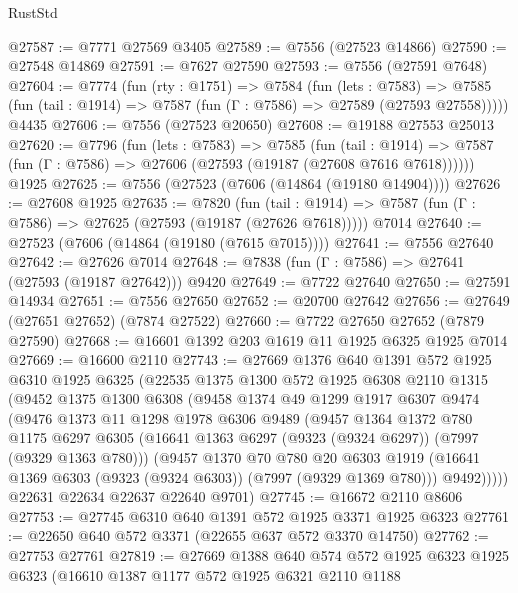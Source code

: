 \begin{lexlean}{RustStd}
\begin{coremodule}
@27587 := @7771 @27569 @3405
@27589 := @7556 (@27523 @14866)
@27590 := @27548 @14869
@27591 := @7627 @27590
@27593 := @7556 (@27591 @7648)
@27604 := @7774
    (fun (rty : @1751) =>
    @7584
      (fun (lets : @7583) =>
      @7585 (fun (tail : @1914) => @7587 (fun (Γ : @7586) => @27589 (@27593 @27558)))))
    @4435
@27606 := @7556 (@27523 @20650)
@27608 := @19188 @27553 @25013
@27620 := @7796
    (fun (lets : @7583) =>
    @7585
      (fun (tail : @1914) =>
      @7587 (fun (Γ : @7586) => @27606 (@27593 (@19187 (@27608 @7616 @7618))))))
    @1925
@27625 := @7556 (@27523 (@7606 (@14864 (@19180 @14904))))
@27626 := @27608 @1925
@27635 := @7820
    (fun (tail : @1914) => @7587 (fun (Γ : @7586) => @27625 (@27593 (@19187 (@27626 @7618)))))
    @7014
@27640 := @27523 (@7606 (@14864 (@19180 (@7615 @7015))))
@27641 := @7556 @27640
@27642 := @27626 @7014
@27648 := @7838 (fun (Γ : @7586) => @27641 (@27593 (@19187 @27642))) @9420
@27649 := @7722 @27640
@27650 := @27591 @14934
@27651 := @7556 @27650
@27652 := @20700 @27642
@27656 := @27649 (@27651 @27652) (@7874 @27522)
@27660 := @7722 @27650 @27652 (@7879 @27590)
@27668 := @16601 @1392 @203 @1619 @11 @1925 @6325 @1925 @7014
@27669 := @16600 @2110
@27743 := @27669
    @1376
    @640
    @1391
    @572
    @1925
    @6310
    @1925
    @6325
    (@22535
      @1375
      @1300
      @572
      @1925
      @6308
      @2110
      @1315
      (@9452
        @1375
        @1300
        @6308
        (@9458
          @1374
          @49
          @1299
          @1917
          @6307
          @9474
          (@9476
            @1373
            @11
            @1298
            @1978
            @6306
            @9489
            (@9457
              @1364
              @1372
              @780
              @1175
              @6297
              @6305
              (@16641 @1363 @6297 (@9323 (@9324 @6297)) (@7997 (@9329 @1363 @780)))
              (@9457
                @1370
                @70
                @780
                @20
                @6303
                @1919
                (@16641 @1369 @6303 (@9323 (@9324 @6303)) (@7997 (@9329 @1369 @780)))
                @9492)))))
      @22631
      @22634
      @22637
      @22640
      @9701)
@27745 := @16672 @2110 @8606
@27753 := @27745 @6310 @640 @1391 @572 @1925 @3371 @1925 @6323
@27761 := @22650 @640 @572 @3371 (@22655 @637 @572 @3370 @14750)
@27762 := @27753 @27761
@27819 := @27669
    @1388
    @640
    @574
    @572
    @1925
    @6323
    @1925
    @6323
    (@16610
      @1387
      @1177
      @572
      @1925
      @6321
      @2110
      @1188

\end{coremodule}
\end{lexlean}
